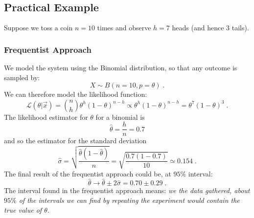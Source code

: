 \documentclass[12pt,a4paper]{article}
\begin{document}
\subsection{Practical Example}
Suppose we toss a coin $n=10$ times and observe $h=7$ heads (and hence $3$ tails).

\subsubsection*{Frequentist Approach}
We model the system using the Binomial distribution, so that any outcome is sampled by:
$$
X \sim B(n=10, p=\theta)\;.
$$
We can therefore model the likelihood function:
\begin{equation*}
	\mathcal{L}(\theta | \vec{x}) = \binom{n}{h} \theta^h (1-\theta)^{n-h} \propto \theta^h (1-\theta)^{n-h} = \theta^7 (1-\theta)^{3} \;.
\end{equation*}
The likelihood estimator for $\theta$ for a binomial is
$$\hat{\theta} = \frac{h}{n} = 0.7$$
and so the estimator for the standard deviation
$$\hat{\sigma} = \sqrt{\frac{\hat{\theta}(1-\hat{\theta})}{n}} = \sqrt{\frac{0.7 (1-0.7)}{10}} \simeq 0.154 \;.$$
The final result of the frequentist approach could be, at $95\% $ interval:
$$
\hat{\theta} \rightarrow \hat{\theta} \pm 2 \hat{\sigma} = 0.70 \pm 0.29\;.
$$ 
The interval found in the frequentist approach means: \textit{we the data gathered, about $95\% $ of the intervals we can find by repeating the experiment would contain the true value of $\theta$.}
\end{document}
